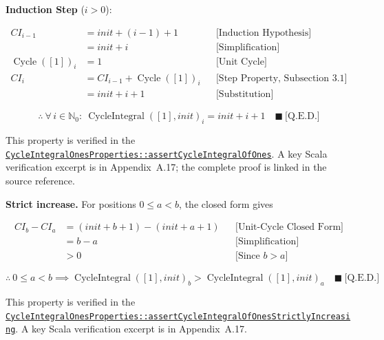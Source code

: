 \textbf{Induction Step} ($i > 0$):

\begin{equation*}
\begin{aligned}
CI_{i-1} &= init + (i-1) + 1 && \text{[Induction Hypothesis]} \\
&= init + i && \text{[Simplification]} \\
\operatorname{Cycle}([1])_i &= 1 && \text{[Unit Cycle]} \\
CI_i &= CI_{i-1} + \operatorname{Cycle}([1])_i && \text{[Step Property, Subsection~3.1]} \\
&= init + i + 1 && \text{[Substitution]}
\end{aligned}
\end{equation*}

\begin{equation*}
\therefore\ \forall\, i \in \mathbb{N}_0:\ \operatorname{CycleIntegral}([1], init)_i = init + i + 1
\quad \blacksquare\ \text{[Q.E.D.]}
\end{equation*}

{\raggedright
This property is verified in the
\href{https://github.com/thiagomata/prime-numbers/blob/integral-cycle-article-v1.0.0/src/main/scala/v1/chapter4/cycle/integral/recursive/properties/CycleIntegralOnesProperties.scala}{\texttt{CycleIntegralOnesProperties::\allowbreak assert\allowbreak Cycle\allowbreak Integral\allowbreak Of\allowbreak Ones}}.
A key Scala verification excerpt is in Appendix~A.17; the complete proof is
linked in the source reference.
\par}

\textbf{Strict increase.} For positions $0 \leq a < b$, the closed form
gives

\begin{equation*}
\begin{aligned}
CI_b - CI_a &= (init + b + 1) - (init + a + 1) && \text{[Unit-Cycle Closed Form]} \\
&= b - a && \text{[Simplification]} \\
&> 0 && \text{[Since } b > a\text{]}
\end{aligned}
\end{equation*}

\begin{equation*}
\therefore\ 0 \leq a < b \implies \operatorname{CycleIntegral}([1], init)_b > \operatorname{CycleIntegral}([1], init)_a
\quad \blacksquare\ \text{[Q.E.D.]}
\end{equation*}

{\raggedright
This property is verified in the
\href{https://github.com/thiagomata/prime-numbers/blob/integral-cycle-article-v1.0.0/src/main/scala/v1/chapter4/cycle/integral/recursive/properties/CycleIntegralOnesProperties.scala}{\texttt{CycleIntegralOnesProperties::\allowbreak assert\allowbreak Cycle\allowbreak Integral\allowbreak Of\allowbreak Ones\allowbreak Strictly\allowbreak Increasing}}.
A key Scala verification excerpt is in Appendix~A.17.
\par}
